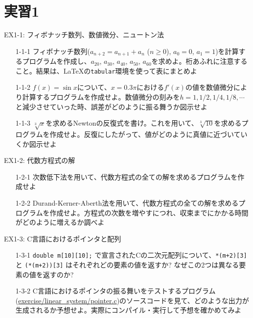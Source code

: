 \section{実習1}

\begin{frame}[t,fragile]{EX1-1: フィボナッチ数列、数値微分、ニュートン法}
  \begin{itemize}
    \setlength{\itemsep}{1em}
  \item[1-1-1] フィボナッチ数列($a_{n+2}=a_{n+1}+a_n$ ($n \ge 0$), $a_0=0$, $a_1=1$)を計算するプログラムを作成し、$a_{20}$, $a_{30}$, $a_{40}$, $a_{50}$, $a_{60}$を求めよ。桁あふれに注意すること。結果は、\LaTeX の{\tt tabular}環境を使って表にまとめよ
  \item[1-1-2] $f(x)=\sin x$について、$x=0.3\pi$における$f'(x)$の値を数値微分により計算するプログラムを作成せよ。数値微分の刻みを$h=1,1/2,1/4,1/8,\cdots$と減少させていった時、誤差がどのように振る舞うか図示せよ
  \item[1-1-3] $\sqrt[3]{x}$を求めるNewtonの反復式を書け。これを用いて、$\sqrt[3]{10}$を求めるプログラムを作成せよ。反復にしたがって、値がどのように真値に近づいていくか図示せよ
  \end{itemize}    
\end{frame}

\begin{frame}[t,fragile]{EX1-2: 代数方程式の解}
  \begin{itemize}
    \setlength{\itemsep}{1em}
  \item[1-2-1] 次数低下法を用いて、代数方程式の全ての解を求めるプログラムを作成せよ
  \item[1-2-2] Durand-Kerner-Aberth法を用いて、代数方程式の全ての解を求めるプログラムを作成せよ。方程式の次数を増やすにつれ、収束までにかかる時間がどのように増えるか調べよ
  \end{itemize}    
\end{frame}

\begin{frame}[t,fragile]{EX1-3: C言語におけるポインタと配列}
  \begin{itemize}
    \setlength{\itemsep}{1em}
  \item[1-3-1] \verb+double m[10][10];+ で宣言されたCの二次元配列について、\verb^*(m+2)[3]^ と \verb^(*(m+2))[3]^ はそれぞれどの要素の値を返すか? なぜこの2つは異なる要素の値を返すのか?
  \item[1-3-2] C言語におけるポインタの振る舞いをテストするプログラム(\href{https://github.com/todo-group/computer-experiments/blob/master/exercise/linear_system/pointer.c}{exercise/linear\_system/pointer.c})のソースコードを見て、どのような出力が生成されるか予想せよ。実際にコンパイル・実行して予想を確かめてみよ
  \end{itemize}
\end{frame}
